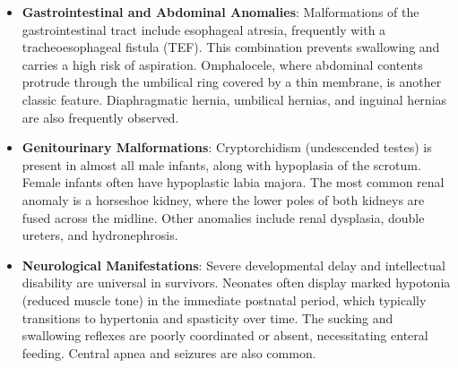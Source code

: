 \begin{itemize}
    \item \textbf{Gastrointestinal and Abdominal Anomalies}: Malformations of the gastrointestinal tract include esophageal atresia, frequently with a tracheoesophageal fistula (TEF). This combination prevents swallowing and carries a high risk of aspiration. Omphalocele, where abdominal contents protrude through the umbilical ring covered by a thin membrane, is another classic feature. Diaphragmatic hernia, umbilical hernias, and inguinal hernias are also frequently observed.
    \item \textbf{Genitourinary Malformations}: Cryptorchidism (undescended testes) is present in almost all male infants, along with hypoplasia of the scrotum. Female infants often have hypoplastic labia majora. The most common renal anomaly is a horseshoe kidney, where the lower poles of both kidneys are fused across the midline. Other anomalies include renal dysplasia, double ureters, and hydronephrosis.
    \item \textbf{Neurological Manifestations}: Severe developmental delay and intellectual disability are universal in survivors. Neonates often display marked hypotonia (reduced muscle tone) in the immediate postnatal period, which typically transitions to hypertonia and spasticity over time. The sucking and swallowing reflexes are poorly coordinated or absent, necessitating enteral feeding. Central apnea and seizures are also common.
\end{itemize}

